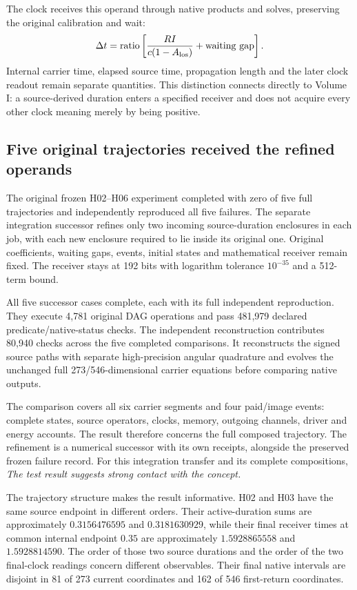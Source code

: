 The clock receives this operand through native products and solves, preserving the original calibration and wait:
\begin{equation}
 \Delta t=\mathrm{ratio}\left[
 \frac{RI}{c(1-A_{\rm los})}+\mathrm{waiting\ gap}\right].
\end{equation}
Internal carrier time, elapsed source time, propagation length and the later clock readout remain separate quantities. This distinction connects directly to Volume I: a source-derived duration enters a specified receiver and does not acquire every other clock meaning merely by being positive.

\subsection{Five original trajectories received the refined operands}

The original frozen H02--H06 experiment completed with zero of five full trajectories and independently reproduced all five failures. The separate integration successor refines only two incoming source-duration enclosures in each job, with each new enclosure required to lie inside its original one. Original coefficients, waiting gaps, events, initial states and mathematical receiver remain fixed. The receiver stays at 192 bits with logarithm tolerance $10^{-35}$ and a 512-term bound.

All five successor cases complete, each with its full independent reproduction. They execute 4,781 original DAG operations and pass 481,979 declared predicate/native-status checks. The independent reconstruction contributes 80,940 checks across the five completed comparisons. It reconstructs the signed source paths with separate high-precision angular quadrature and evolves the unchanged full 273/546-dimensional carrier equations before comparing native outputs.

The comparison covers all six carrier segments and four paid/image events: complete states, source operators, clocks, memory, outgoing channels, driver and energy accounts. The result therefore concerns the full composed trajectory. The refinement is a numerical successor with its own receipts, alongside the preserved frozen failure record. For this integration transfer and its complete compositions, \emph{The test result suggests strong contact with the concept.}

The trajectory structure makes the result informative. H02 and H03 have the same source endpoint in different orders. Their active-duration sums are approximately $0.3156476595$ and $0.3181630929$, while their final receiver times at common internal endpoint $0.35$ are approximately $1.5928865558$ and $1.5928814590$. The order of those two source durations and the order of the two final-clock readings concern different observables. Their final native intervals are disjoint in 81 of 273 current coordinates and 162 of 546 first-return coordinates.

